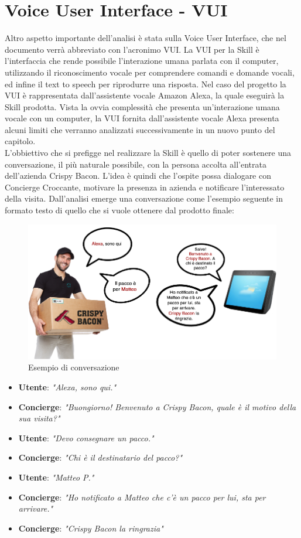 \section{Voice User Interface - VUI}
\label{vui}
Altro aspetto importante dell'analisi è stata sulla Voice User Interface, che nel documento verrà abbreviato con l'acronimo VUI. La VUI per la Skill è l’interfaccia che rende possibile l’interazione umana parlata con il computer, utilizzando il riconoscimento vocale per comprendere comandi e domande vocali, ed infine il text to speech per riprodurre una risposta. Nel caso del progetto la VUI è rappresentata dall'assistente vocale Amazon Alexa, la quale eseguirà la Skill prodotta. Vista la ovvia complessità che presenta un'interazione umana vocale con un computer, la VUI fornita dall'assistente vocale Alexa presenta alcuni limiti che verranno analizzati successivamente in un nuovo punto del capitolo.\\
L’obbiettivo che si prefigge nel realizzare la Skill è quello di poter sostenere una conversazione, il più naturale possibile, con la persona accolta all'entrata dell'azienda Crispy Bacon. L’idea è quindi che l’ospite possa dialogare con Concierge Croccante, motivare la presenza in azienda e notificare l’interessato della visita. Dall'analisi emerge una conversazione come l'esempio seguente in formato testo di quello che si vuole ottenere dal prodotto finale:
\begin{figure}[H] 
    \centering 
    \includegraphics[width=1\columnwidth]{immagini/esempioVUI.png}
    \caption{\label{fig:esempioVUI}Esempio di conversazione}
\end{figure}
\begin{itemize}
	\item \textbf{Utente}: \textit{"Alexa, sono qui."}
	\item \textbf{Concierge}: \textit{ "Buongiorno! Benvenuto a Crispy Bacon, quale è il motivo della sua visita?"}
	\item \textbf{Utente}: \textit{"Devo consegnare un pacco."}
	\item \textbf{Concierge}: \textit{ "Chi è il destinatario del pacco?"}
	\item \textbf{Utente}: \textit{"Matteo P."}
	\item \textbf{Concierge}: \textit{ "Ho notificato a Matteo che c'è un pacco per lui, sta per arrivare."}
	\item \textbf{Concierge}: \textit{ "Crispy Bacon la ringrazia"}
\end{itemize}

